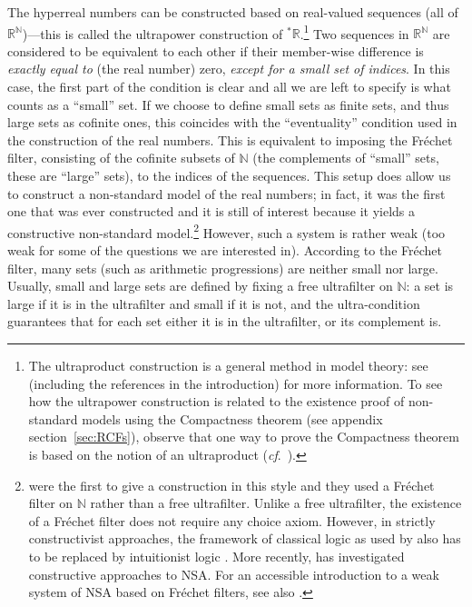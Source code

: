 The hyperreal numbers can be constructed based on real-valued sequences (all of $\mathbb{R}^\mathbb{N}$)---this is called the ultrapower construction of ${^\ast\mathbb{R}}$.\footnote{The ultraproduct construction is a general method in model theory: see \citet{Keisler:2010} (including the references in the introduction) for more information. To see how the ultrapower construction is related to the existence proof of non-standard models using the Compactness theorem (see appendix section~\ref{sec:RCFs}), observe that one way to prove the Compactness theorem is based on the notion of an ultraproduct (\textit{cf}.\ \citealp[p.~11]{Goldblatt:1998}).} Two sequences in $\mathbb{R}^\mathbb{N}$ are considered to be equivalent to each other if their member-wise difference is \textit{exactly equal to} (the real number) zero, \textit{except for a small set of indices}. In this case, the first part of the condition is clear and all we are left to specify is what counts as a ``small'' set. If we choose to define small sets as finite sets, and thus large sets as cofinite ones, this coincides with the ``eventuality'' condition used in the construction of the real numbers. This is equivalent to imposing the Fr\'echet filter, consisting of the cofinite subsets of $\mathbb{N}$ (the complements of ``small'' sets, these are ``large'' sets), to the indices of the sequences. This setup does allow us to construct a non-standard model of the real numbers; in fact, it was the first one that was ever constructed and it is still of interest because it yields a constructive non-standard model.\footnote{\citet{SchmiedenLaugwitz:1958} were the first to give a construction in this style and they used a Fr\'{e}chet filter on $\mathbb{N}$ rather than a free ultrafilter. Unlike a free ultrafilter, the existence of a Fr\'{e}chet filter does not require any choice axiom. However, in strictly constructivist approaches, the framework of classical logic as used by \citet{SchmiedenLaugwitz:1958} also has to be replaced by intuitionist logic \citep{Martin-Lof:1990}. More recently, \citet{Palmgren:1998} has investigated constructive approaches to NSA. For an accessible introduction to a weak system of NSA based on Fr\'{e}chet filters, see also \citet{Tao:2012}.} However, such a system is rather weak (too weak for some of the questions we are interested in). According to the Fr\'echet filter, many sets (such as arithmetic progressions) are neither small nor large. Usually, small and large sets are defined by fixing a free ultrafilter on $\mathbb{N}$: a set is large if it is in the ultrafilter and small if it is not, and the ultra-condition guarantees that for each set either it is in the ultrafilter, or its complement is.

